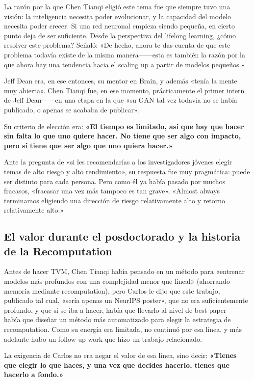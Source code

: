 La razón por la que Chen Tianqi eligió este tema fue que siempre tuvo una visión: la inteligencia necesita poder evolucionar, y la capacidad del modelo necesita poder crecer. Si una red neuronal empieza siendo pequeña, en cierto punto deja de ser suficiente. Desde la perspectiva del lifelong learning, ¿cómo resolver este problema? Señaló: «De hecho, ahora te das cuenta de que este problema todavía existe de la misma manera------esta es también la razón por la que ahora hay una tendencia hacia el scaling up a partir de modelos pequeños.»

Jeff Dean era, en ese entonces, su mentor en Brain, y además «tenía la mente muy abierta». Chen Tianqi fue, en ese momento, prácticamente el primer intern de Jeff Dean------en una etapa en la que «su GAN tal vez todavía no se había publicado, o apenas se acababa de publicar».

Su criterio de elección era: \textbf{«El tiempo es limitado, así que hay que hacer sin falta lo que uno quiere hacer. No tiene que ser algo con impacto, pero sí tiene que ser algo que uno quiera hacer.»}

Ante la pregunta de «si les recomendarías a los investigadores jóvenes elegir temas de alto riesgo y alto rendimiento», su respuesta fue muy pragmática: puede ser distinto para cada persona. Pero como él ya había pasado por muchos fracasos, «fracasar una vez más tampoco es tan grave». «Almost always terminamos eligiendo una dirección de riesgo relativamente alto y retorno relativamente alto.»

\subsection{El valor durante el posdoctorado y la historia de la Recomputation}

Antes de hacer TVM, Chen Tianqi había pensado en un método para «entrenar modelos más profundos con una complejidad menor que lineal» (ahorrando memoria mediante recomputation), pero Carlos le dijo que este trabajo, publicado tal cual, «sería apenas un NeurIPS poster», que no era suficientemente profundo, y que si se iba a hacer, había que llevarlo al nivel de best paper------había que diseñar un método más automatizado para elegir la estrategia de recomputation. Como su energía era limitada, no continuó por esa línea, y más adelante hubo un follow-up work que hizo un trabajo relacionado.

La exigencia de Carlos no era negar el valor de esa línea, sino decir: \textbf{«Tienes que elegir lo que haces, y una vez que decides hacerlo, tienes que hacerlo a fondo.»}

